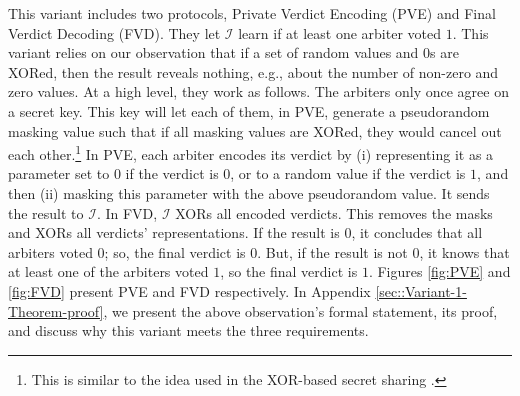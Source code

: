 This variant includes two protocols,  Private Verdict Encoding (PVE) and Final Verdict Decoding (FVD). They  let $\mathcal{I}$ learn if at least one arbiter voted $1$. This variant   relies on our observation that   if   a set of random values and $0$s are XORed, then the result   reveals nothing, e.g.,  about the number of non-zero and  zero values. At a high level, they work as follows.  The arbiters only once agree on a secret key. This key will let each of them, in PVE,  generate a pseudorandom masking value such that if all masking values are XORed, they would cancel out each other.\footnote{This is similar to the idea used in the XOR-based secret sharing \cite{Schneier0078909}.} In PVE, each arbiter encodes its verdict by (i) representing it as a parameter  set to  $0$ if the verdict is $0$, or to a random value if the verdict is $1$, and then (ii) masking this parameter with the above  pseudorandom value.  It sends the result to $\mathcal{I}$.  In FVD,  $\mathcal{I}$   XORs all encoded verdicts. This removes the masks and XORs all verdicts' representations.  If the result is $0$,   it concludes that  all arbiters  voted $0$; so,  the final verdict is $0$. But, if the result is not $0$,  it knows that at least one of the arbiters voted $1$, so  the final verdict is $1$. Figures \ref{fig:PVE} and \ref{fig:FVD} present  PVE and FVD respectively.  In Appendix \ref{sec::Variant-1-Theorem-proof}, we present the above observation's formal statement,  its proof, and discuss why this variant meets the  three requirements.


 
